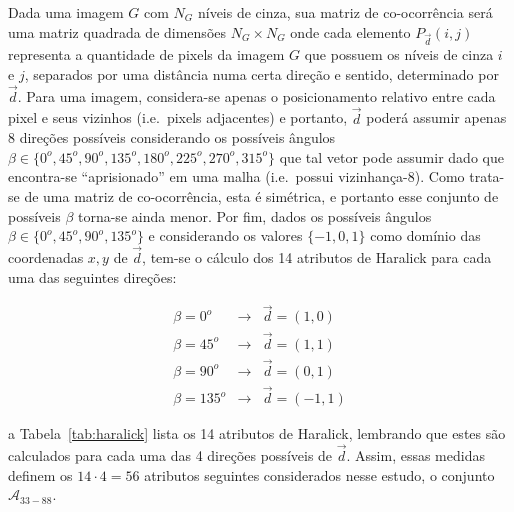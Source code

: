 Dada uma imagem $G$ com $N_G$ níveis de cinza, sua matriz de co-ocorrência será
uma matriz quadrada de dimensões $N_G \times N_G$ onde cada elemento $P_{\vec{d}}(i,j)$ representa
a quantidade de pixels da imagem $G$ que possuem os níveis de cinza $i$ e $j$,
separados por uma distância numa certa direção e sentido, determinado por
$\vec{d}$. Para uma imagem, considera-se apenas o posicionamento relativo entre
cada pixel e seus vizinhos (i.e.\ pixels adjacentes) e portanto, $\vec{d}$
poderá assumir apenas 8 direções possíveis considerando os possíveis ângulos
$\beta \in \{0^o, 45^o, 90^o, 135^o, 180^o, 225^o, 270^o, 315^o\}$ que tal
vetor pode assumir dado que encontra-se ``aprisionado'' em uma malha
(i.e.\ possui vizinhança-8). Como
trata-se de uma matriz de co-ocorrência, esta é simétrica, e portanto esse
conjunto de possíveis $\beta$ torna-se ainda menor. Por fim, dados os possíveis
ângulos $\beta \in \{0^o, 45^o, 90^o, 135^o\}$ e considerando os valores $\{-1,
0, 1\}$ como domínio das coordenadas $x,y$ de $\vec{d}$, tem-se o cálculo dos 14
atributos de Haralick para cada uma das seguintes direções:

\begin{eqnarray}
  \beta = 0^o & \to & \vec{d} = (1, 0) \\
  \beta = 45^o & \to & \vec{d} = (1, 1) \\
  \beta = 90^o & \to & \vec{d} = (0, 1) \\
  \beta = 135^o & \to & \vec{d} = (-1, 1)
\end{eqnarray}

\noindent a Tabela~\ref{tab:haralick} lista os 14 atributos de Haralick,
lembrando que estes são calculados para cada uma das 4 direções possíveis de
$\vec{d}$. Assim, essas medidas definem os $14 \cdot 4 = 56$ atributos seguintes
considerados nesse estudo, o conjunto $\mathcal{A}_{33-88}$.

